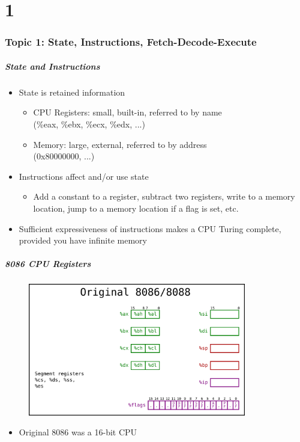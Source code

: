 \documentclass[11pt,xcolor=dvipsnames]{beamer}
\newcommand{\vs}{\vspace{0.5em}}
\begin{document}
\part{1}

\section{Topic 1: State, Instructions, Fetch-Decode-Execute}
\begin{frame}[fragile,t]

\frametitle{State and Instructions}
\begin{itemize}
    \item State is retained information
    \begin{itemize}
        \item CPU Registers: small, built-in, referred to by name \\ ({\ttfamily \%eax, \%ebx, \%ecx, \%edx, ...})
        \item Memory: large, external, referred to by address \\ ({\ttfamily 0x80000000, ...})
    \end{itemize}
    \item Instructions affect and/or use state
    \begin{itemize}
        \item Add a constant to a register, subtract two registers, write to a memory location, jump to a memory location if a flag is set, etc.
    \end{itemize}
    \vs
    \pause
    \item Sufficient expressiveness of instructions makes a CPU Turing complete, provided you have infinite memory
\end{itemize}
\end{frame}

\begin{frame}[fragile,t]
\frametitle{8086 CPU Registers}
\begin{figure}
\centering \includegraphics[width=0.85\textwidth]{figures/8086state.png}
\end{figure}
\begin{itemize}
    \item Original 8086 was a 16-bit CPU
\end{itemize}
\end{frame}
\end{document}
